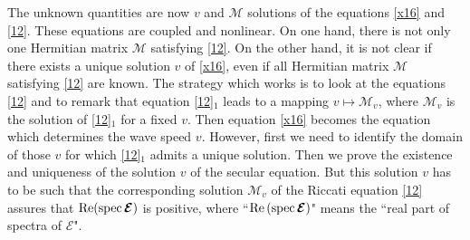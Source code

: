 \documentclass[10pt]{article}
\begin{document}
 The unknown  {quantities} are  {now} $v$ and $\boldsymbol{\mathcal{M}}$ solutions of the equations \eqref{x16} and  {\eqref{12}}. These equations are coupled and nonlinear.  On one hand, there is not only one   Hermitian matrix $\boldsymbol{\mathcal{M}}$ satisfying \eqref{12}. On the other hand, it is not clear if there exists  {a unique} solution $v$ of \eqref{x16}, even if all Hermitian matrix $\boldsymbol{\mathcal{M}}$ satisfying \eqref{12} are known. The strategy which works is to look at the equations \eqref{12} and to remark that  equation \eqref{12}$_1$ leads to a mapping $v\mapsto\boldsymbol{\boldsymbol{\mathcal{M}}}_v$, where $\boldsymbol{\mathcal{M}}_v$ is the solution of \eqref{12}$_1$ for a fixed $v$. Then equation \eqref{x16}  becomes the equation which determines the wave speed  $v$.  However, first we need to identify the domain of those $v$ for which  \eqref{12}$_1$ admits a unique solution. Then we  prove the existence and uniqueness of the solution $v$ of the secular equation. But this solution $v$ has to be such that the  corresponding   solution $\boldsymbol{\mathcal{M}}_v$ of the Riccati equation \eqref{12} assures  that $\text{Re(spec}\,\boldsymbol{\mathcal{E}}{\rm )}$ is positive, 	where ``$\text{\rm Re\,(spec\,}\boldsymbol{\mathcal{E}}{\rm )}$" means the ``real part of spectra of $\boldsymbol{\mathcal{E}}$".
 
\end{document}

